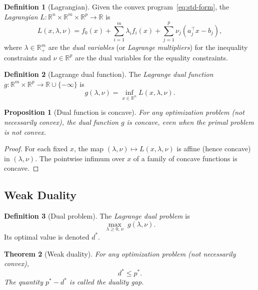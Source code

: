 \documentclass[11pt,a4paper]{article}
\theoremstyle{definition}
\newtheorem{definition}{Definition}[section]
\theoremstyle{plain}
\newtheorem{theorem}{Theorem}[section]
\newtheorem{proposition}[theorem]{Proposition}
\theoremstyle{remark}
\newcommand{\R}{\mathbb{R}}
\begin{document}
\begin{definition}[Lagrangian]\label{def:lagrangian}
Given the convex program~\eqref{eq:std-form}, the \emph{Lagrangian}
$L : \R^n \times \R^m \times \R^p \to \R$ is
\begin{equation}\label{eq:lagrangian}
  L(x, \lambda, \nu) = f_0(x) + \sum_{i=1}^m \lambda_i f_i(x)
    + \sum_{j=1}^p \nu_j (a_j^\top x - b_j),
\end{equation}
where $\lambda \in \R^m_+$ are the \emph{dual variables} (or \emph{Lagrange
multipliers}) for the inequality constraints and $\nu \in \R^p$ are the dual
variables for the equality constraints.
\end{definition}

\begin{definition}[Lagrange dual function]\label{def:dual-fn}
The \emph{Lagrange dual function} $g : \R^m \times \R^p \to
\R \cup \{-\infty\}$ is
\begin{equation}\label{eq:dual-fn}
  g(\lambda, \nu) = \inf_{x \in \R^n} L(x, \lambda, \nu).
\end{equation}
\end{definition}

\begin{proposition}[Dual function is concave]\label{prop:dual-concave}
For any optimization problem (not necessarily convex), the dual function $g$ is
concave, even when the primal problem is not convex.
\end{proposition}

\begin{proof}
For each fixed $x$, the map $(\lambda, \nu) \mapsto L(x, \lambda, \nu)$ is
affine (hence concave) in $(\lambda, \nu)$. The pointwise infimum over $x$ of
a family of concave functions is concave.
\end{proof}

\subsection{Weak Duality}

\begin{definition}[Dual problem]\label{def:dual-problem}
The \emph{Lagrange dual problem} is
\begin{equation}\label{eq:dual-problem}
  \max_{\lambda \ge 0,\, \nu} \; g(\lambda, \nu).
\end{equation}
Its optimal value is denoted $d^*$.
\end{definition}

\begin{theorem}[Weak duality]\label{thm:weak-duality}
For any optimization problem (not necessarily convex),
\begin{equation}\label{eq:weak-duality}
  d^* \le p^*.
\end{equation}
The quantity $p^* - d^*$ is called the \emph{duality gap}.
\end{theorem}
\end{document}
